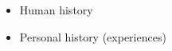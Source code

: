 \documentclass[12pt]{article}
\begin{document}
\begin{enumerate}
\begin{enumerate}
        \begin{itemize}

          \item Human history

          \item Personal history (experiences)

        \end{itemize}

    \end{enumerate}

\end{enumerate}
\end{document}
